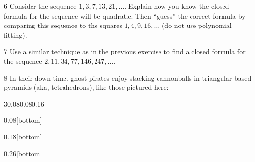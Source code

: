 \documentclass[11pt,]{book}
\theoremstyle{ptxplainnotitle}
\theoremstyle{ptxplaintitle}
\theoremstyle{ptxdefinitionnotitle}
\theoremstyle{ptxdefinitiontitle}
\theoremstyle{ptxdefinitionnotitle}
\theoremstyle{ptxdefinitiontitle}
\theoremstyle{ptxdefinitionnotitle}
\theoremstyle{ptxdefinitiontitle}
\theoremstyle{ptxdefinitiontitlenonumber}
\theoremstyle{ptxdefinitiontitlenonumber}
\numberwithin{equation}{chapter}
\begin{document}
\begin{divisionexercise}{6}\hypertarget{exercise-34}{}
\hypertarget{p-391}{}%
Consider the sequence \(1, 3, 7, 13, 21, \ldots\). Explain how you know the closed formula for the sequence will be quadratic. Then ``guess'' the correct formula by comparing this sequence to the squares \(1, 4, 9, 16, \ldots\) (do not use polynomial fitting).%
\end{divisionexercise}%
\begin{divisionexercise}{7}\hypertarget{exercise-35}{}
\hypertarget{p-394}{}%
Use a similar technique as in the previous exercise to find a closed formula for the sequence \(2, 11, 34, 77, 146, 247,\ldots\).%
\end{divisionexercise}%
\begin{divisionexercise}{8}\hypertarget{exercise-36}{}
\hypertarget{p-395}{}%
In their down time, ghost pirates enjoy stacking cannonballs in triangular based pyramids (aka, tetrahedrons), like those pictured here:%
\begin{sidebyside}{3}{0.08}{0.08}{0.16}
\begin{sbspanel}{0.08}[bottom]
\end{sbspanel}
\begin{sbspanel}{0.18}[bottom]
\end{sbspanel}
\begin{sbspanel}{0.26}[bottom]
\end{sbspanel}

\end{sidebyside}
\end{divisionexercise}
\end{document}
